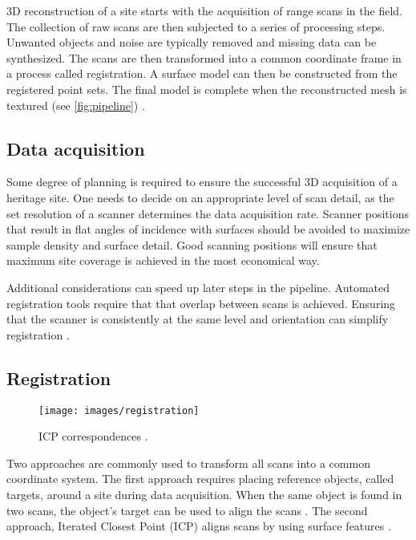 3D reconstruction of a site starts with the acquisition of range scans in the field. The collection of raw scans are then subjected to a series of processing steps. Unwanted objects and noise are typically removed and missing data can be synthesized. The scans are then transformed into a common coordinate frame in a process called registration. A surface model can then be constructed from the registered point sets. The final model is complete when the reconstructed mesh is textured (see \autoref{fig:pipeline}) \cite{Ruther2011}.

\subsection{Data acquisition}
Some degree of planning is required to ensure the successful 3D acquisition of a heritage site. One needs to decide on an appropriate level of scan detail, as the set resolution of a scanner determines the data acquisition rate. Scanner positions that result in flat angles of incidence with surfaces should be avoided to maximize sample density and surface detail. Good scanning positions will ensure that maximum site coverage is achieved in the most economical way.

Additional considerations can speed up later steps in the pipeline. Automated registration tools require that that overlap between scans is achieved. Ensuring that the scanner is consistently at the same level and orientation can simplify registration \cite{Ruther2011}.

\subsection{Registration}  \label{sec:registration}

\begin{figure}[ht]
  \centering
  \texttt{[image: images/registration]}
  \caption{ICP correspondences \protect\footnotemark.}
  \label{fig:registration}
\end{figure}

Two approaches are commonly used to transform all scans into a common coordinate system. The first approach requires placing reference objects, called targets, around a site during data acquisition. When the same object is found in two scans, the object's target can be used to align the scans \cite{Besl1992}. The second approach, Iterated Closest Point (ICP) aligns scans by using surface features \cite{Bernardini2002}.

